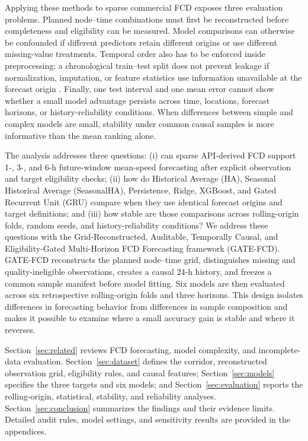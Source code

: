 \documentclass[pdflatex,sn-basic,Numbered]{sn-jnl}
\begin{document}
Applying these methods to sparse commercial FCD exposes three evaluation problems. Planned node--time combinations must first be reconstructed before completeness and eligibility can be measured. Model comparisons can otherwise be confounded if different predictors retain different origins or use different missing-value treatments. Temporal order also has to be enforced inside preprocessing: a chronological train--test split does not prevent leakage if normalization, imputation, or feature statistics use information unavailable at the forecast origin \cite{Hewamalage2023ForecastEvaluation}. Finally, one test interval and one mean error cannot show whether a small model advantage persists across time, locations, forecast horizons, or history-reliability conditions. When differences between simple and complex models are small, stability under common causal samples is more informative than the mean ranking alone.

The analysis addresses three questions: (i) can sparse API-derived FCD support 1-, 3-, and 6-h future-window mean-speed forecasting after explicit observation and target eligibility checks; (ii) how do Historical Average (HA), Seasonal Historical Average (SeasonalHA), Persistence, Ridge, XGBoost, and Gated Recurrent Unit (GRU) compare when they use identical forecast origins and target definitions; and (iii) how stable are those comparisons across rolling-origin folds, random seeds, and history-reliability conditions? We address these questions with the Grid-Reconstructed, Auditable, Temporally Causal, and Eligibility-Gated Multi-Horizon FCD Forecasting framework (GATE-FCD). GATE-FCD reconstructs the planned node--time grid, distinguishes missing and quality-ineligible observations, creates a causal 24-h history, and freezes a common sample manifest before model fitting. Six models are then evaluated across six retrospective rolling-origin folds and three horizons. This design isolates differences in forecasting behavior from differences in sample composition and makes it possible to examine where a small accuracy gain is stable and where it reverses.

Section~\ref{sec:related} reviews FCD forecasting, model complexity, and incomplete-data evaluation. Section~\ref{sec:dataset} defines the corridor, reconstructed observation grid, eligibility rules, and causal features; Section~\ref{sec:models} specifies the three targets and six models; and Section~\ref{sec:evaluation} reports the rolling-origin, statistical, stability, and reliability analyses. Section~\ref{sec:conclusion} summarizes the findings and their evidence limits. Detailed audit rules, model settings, and sensitivity results are provided in the appendices.
\end{document}
